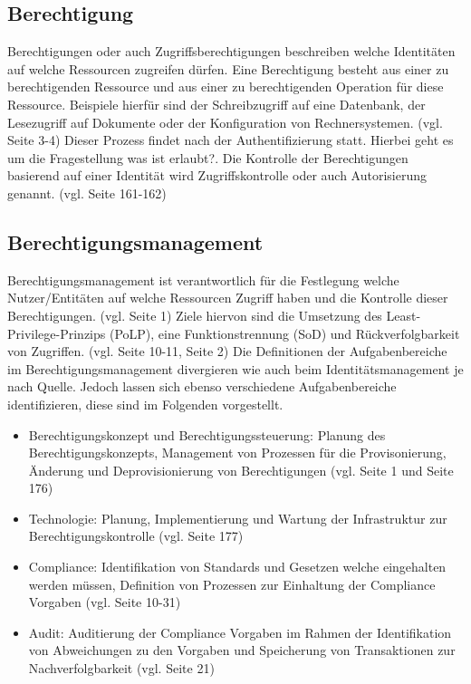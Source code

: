 \documentclass[11pt]{article}
\begin{document}
\subsection{Berechtigung}
Berechtigungen oder auch Zugriffsberechtigungen beschreiben welche Identitäten auf welche Ressourcen zugreifen dürfen. Eine Berechtigung besteht aus einer zu berechtigenden Ressource und aus einer zu berechtigenden Operation für diese Ressource. Beispiele hierfür sind der Schreibzugriff auf eine Datenbank, der Lesezugriff auf Dokumente oder der Konfiguration von Rechnersystemen. (vgl. \cite{tsolkas2017} Seite 3-4) Dieser Prozess findet nach der Authentifizierung statt. Hierbei geht es um die Fragestellung \glqq{}was ist erlaubt?\grqq{}. Die Kontrolle der Berechtigungen basierend auf einer Identität wird Zugriffskontrolle oder auch Autorisierung genannt. (vgl. \cite{tsolkas2017} Seite 161-162)
\subsection{Berechtigungsmanagement}
Berechtigungsmanagement ist verantwortlich für die Festlegung welche Nutzer/Entitäten auf welche Ressourcen Zugriff haben und die Kontrolle dieser Berechtigungen. (vgl. \cite{orp4} Seite 1) Ziele hiervon sind die Umsetzung des Least-Privilege-Prinzips (PoLP), eine Funktionstrennung (SoD) und Rückverfolgbarkeit von Zugriffen. (vgl. \cite{conta2017leitfaden} Seite 10-11, \cite{orp4} Seite 2) Die Definitionen der Aufgabenbereiche im Berechtigungsmanagement divergieren wie auch beim Identitätsmanagement je nach Quelle. Jedoch lassen sich ebenso verschiedene Aufgabenbereiche identifizieren, diese sind im Folgenden vorgestellt.
\begin{itemize}
  \item Berechtigungskonzept und Berechtigungssteuerung: Planung des Berechtigungskonzepts, Management von Prozessen für die Provisonierung, Änderung und Deprovisionierung von Berechtigungen (vgl. \cite{orp4} Seite 1 und \cite{tsolkas2017} Seite 176)
  \item Technologie: Planung, Implementierung und Wartung der Infrastruktur zur Berechtigungskontrolle (vgl. \cite{tsolkas2017} Seite 177)
  \item Compliance: Identifikation von Standards und Gesetzen welche eingehalten werden müssen, Definition von Prozessen zur Einhaltung der Compliance Vorgaben (vgl. \cite{conta2017leitfaden} Seite 10-31)
  \item Audit: Auditierung der Compliance Vorgaben im Rahmen der Identifikation von Abweichungen zu den Vorgaben und Speicherung von Transaktionen zur Nachverfolgbarkeit (vgl. \cite{tsolkas2017} Seite 21)
\end{itemize}
\end{document}

